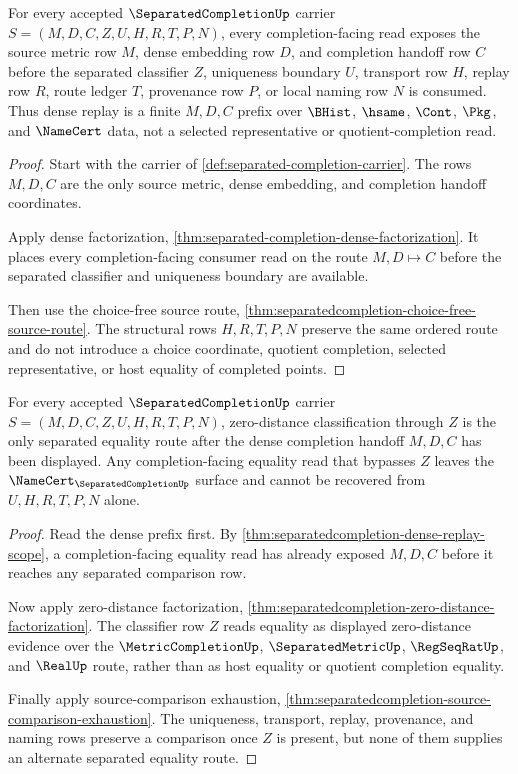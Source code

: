 \begin{theorem}
\label{thm:separatedcompletion-dense-replay-scope}
For every accepted $\SeparatedCompletionUp$ carrier $S=(M,D,C,Z,U,H,R,T,P,N)$, every completion-facing read exposes the source metric row $M$, dense embedding row $D$, and completion handoff row $C$ before the separated classifier $Z$, uniqueness boundary $U$, transport row $H$, replay row $R$, route ledger $T$, provenance row $P$, or local naming row $N$ is consumed. Thus dense replay is a finite $M,D,C$ prefix over $\BHist$, $\hsame$, $\Cont$, $\Pkg$, and $\NameCert$ data, not a selected representative or quotient-completion read.
\end{theorem}
\begin{proof}
Start with the carrier of \autoref{def:separated-completion-carrier}. The rows $M,D,C$ are the only source metric, dense embedding, and completion handoff coordinates.

Apply dense factorization, \autoref{thm:separated-completion-dense-factorization}. It places every completion-facing consumer read on the route $M,D\mapsto C$ before the separated classifier and uniqueness boundary are available.

Then use the choice-free source route, \autoref{thm:separatedcompletion-choice-free-source-route}. The structural rows $H,R,T,P,N$ preserve the same ordered route and do not introduce a choice coordinate, quotient completion, selected representative, or host equality of completed points.
\end{proof}

\begin{theorem}
\label{thm:separatedcompletion-separated-classifier-scope}
For every accepted $\SeparatedCompletionUp$ carrier $S=(M,D,C,Z,U,H,R,T,P,N)$, zero-distance classification through $Z$ is the only separated equality route after the dense completion handoff $M,D,C$ has been displayed. Any completion-facing equality read that bypasses $Z$ leaves the $\NameCert_{\SeparatedCompletionUp}$ surface and cannot be recovered from $U,H,R,T,P,N$ alone.
\end{theorem}
\begin{proof}
Read the dense prefix first. By \autoref{thm:separatedcompletion-dense-replay-scope}, a completion-facing equality read has already exposed $M,D,C$ before it reaches any separated comparison row.

Now apply zero-distance factorization, \autoref{thm:separatedcompletion-zero-distance-factorization}. The classifier row $Z$ reads equality as displayed zero-distance evidence over the $\MetricCompletionUp$, $\SeparatedMetricUp$, $\RegSeqRatUp$, and $\RealUp$ route, rather than as host equality or quotient completion equality.

Finally apply source-comparison exhaustion, \autoref{thm:separatedcompletion-source-comparison-exhaustion}. The uniqueness, transport, replay, provenance, and naming rows preserve a comparison once $Z$ is present, but none of them supplies an alternate separated equality route.
\end{proof}

